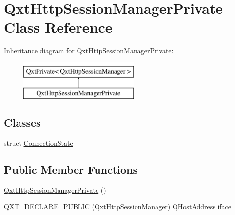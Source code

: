 \hypertarget{class_qxt_http_session_manager_private}{\section{Qxt\-Http\-Session\-Manager\-Private Class Reference}
\label{class_qxt_http_session_manager_private}
}
Inheritance diagram for Qxt\-Http\-Session\-Manager\-Private\-:\begin{figure}[H]
\begin{center}
\leavevmode
\includegraphics[height=2.000000cm]{class_qxt_http_session_manager_private}
\end{center}
\end{figure}
\subsection*{Classes}
\begin{DoxyCompactItemize}
\item 
struct \hyperlink{struct_qxt_http_session_manager_private_1_1_connection_state}{Connection\-State}
\end{DoxyCompactItemize}
\subsection*{Public Member Functions}
\begin{DoxyCompactItemize}
\item 
\hyperlink{class_qxt_http_session_manager_private_a150b1c5dbe774f83cf3583f420f30d98}{Qxt\-Http\-Session\-Manager\-Private} ()
\item 
\hyperlink{class_qxt_http_session_manager_private_a3840ab61ddf2aa7cc29f24038cdbf77a}{Q\-X\-T\-\_\-\-D\-E\-C\-L\-A\-R\-E\-\_\-\-P\-U\-B\-L\-I\-C} (\hyperlink{class_qxt_http_session_manager}{Qxt\-Http\-Session\-Manager}) Q\-Host\-Address iface
\end{DoxyCompactItemize}

